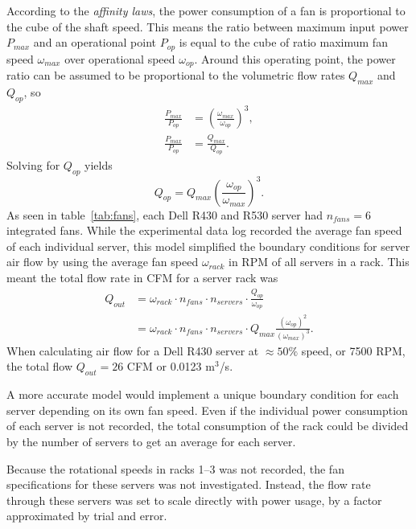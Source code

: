 According to the \textit{affinity laws}, the power consumption of a fan is proportional to the cube of the shaft speed. This means the ratio between maximum input power $P_{max}$ and an operational point $P_{op}$ is equal to the cube of ratio maximum fan speed $\omega_{max}$ over operational speed $\omega_{op}$. Around this operating point, the power ratio can be assumed to be proportional to the volumetric flow rates $Q_{max}$ and $Q_{op}$, so
\begin{align}
\frac{P_{max}}{P_{op}} &= \left( \frac{\omega_{max}}{\omega_{op}} \right)^3,\\
\frac{P_{max}}{P_{op}} &= \frac{Q_{max}}{Q_{op}}.
\end{align}
Solving for $Q_{op}$ yields
\begin{equation}
Q_{op} = Q_{max} \left( \frac{\omega_{op}}{\omega_{max}} \right)^{3}.
\end{equation}
As seen in table~\ref{tab:fans}, each Dell R430 and R530 server had $n_{fans}=6$ integrated fans. While the experimental data log recorded the average fan speed of each individual server, this model simplified the boundary conditions for server air flow by using the average fan speed $\omega_{rack}$ in RPM of all servers in a rack. This meant the total flow rate in CFM for a server rack was
\begin{align}
Q_{out} &= \omega_{rack} \cdot n_{fans} \cdot n_{servers} \cdot \frac{Q_{op}}{\omega_{op}}\\
        &= \omega_{rack} \cdot n_{fans} \cdot n_{servers} \cdot Q_{max}\frac{(\omega_{op})^2}{(\omega_{max})^3}.
\end{align}
When calculating air flow for a Dell R430 server at $\approx 50\%$ speed, or 7500 RPM, the total flow $Q_{out}=26$ CFM or 0.0123 m$^3$/s.

A more accurate model would implement a unique boundary condition for each server depending on its own fan speed. Even if the individual power consumption of each server is not recorded, the total consumption of the rack could be divided by the number of servers to get an average for each server.

Because the rotational speeds in racks 1--3 was not recorded, the fan specifications for these servers was not investigated. Instead, the flow rate through these servers was set to scale directly with power usage, by a factor approximated by trial and error.

